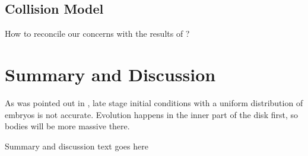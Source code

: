 \documentclass[twocolumn]{aastex63}
\begin{document}

\subsection{Collision Model}


How to reconcile our concerns with the results of \citet{wallace17}?

\section{Summary and Discussion} \label{sec:discuss}

As was pointed out in \citet{clement20},  late stage initial conditions with a uniform distribution of embryos is not accurate. Evolution happens in the inner part of the disk first, so bodies will be more massive there.

Summary and discussion text goes here



\clearpage
\end{document}
